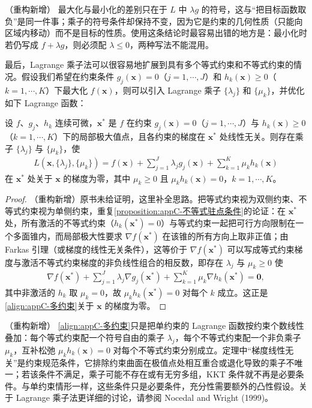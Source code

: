 \documentclass[../main.tex]{subfiles}
\begin{document}
\begin{remark}（重构新增）
最大化与最小化的差别只在于 $L$ 中 $\lambda g$ 的符号，这与“把目标函数取负”是同一件事；乘子的符号条件却保持不变，因为它是约束的几何性质（只能向区域内移动）而不是目标的性质。使用这条结论时最容易出错的地方是：最小化时若仍写成 $f+\lambda g$，则必须配 $\lambda\leqslant0$，两种写法不能混用。
\end{remark}

最后，Lagrange 乘子法可以很容易地扩展到具有多个等式约束和不等式约束的情况。假设我们希望在约束条件 $g_j(\bm{x})=0$（$j=1,\cdots,J$）和 $h_k(\bm{x})\geqslant0$（$k=1,\cdots,K$）下最大化 $f(\bm{x})$，则可以引入 Lagrange 乘子 $\{\lambda_j\}$ 和 $\{\mu_k\}$，并优化如下 Lagrange 函数：
\begin{theorem}\label{theorem:appC-多约束KKT}
设 $f$、$g_j$、$h_k$ 连续可微，$\bm{x}^{*}$ 是 $f$ 在约束 $g_j(\bm{x})=0$（$j=1,\cdots,J$）与 $h_k(\bm{x})\geqslant0$（$k=1,\cdots,K$）下的局部极大值点，且各约束的梯度在 $\bm{x}^{*}$ 处线性无关。则存在乘子 $\{\lambda_j\}$ 与 $\{\mu_k\}$，使
\begin{align}
  L(\bm{x},\{\lambda_j\},\{\mu_k\})=f(\bm{x})+\sum_{j=1}^{J}\lambda_j g_j(\bm{x})+\sum_{k=1}^{K}\mu_k h_k(\bm{x})
  \label{align:appC-多约束}
\end{align}
在 $\bm{x}^{*}$ 处关于 $\bm{x}$ 的梯度为零，其中 $\mu_k\geqslant0$ 且 $\mu_k h_k(\bm{x})=0$，$k=1,\cdots,K$。
\end{theorem}

\begin{proof}
（重构新增）原书未给证明，这里补全思路。把等式约束视为双侧约束、不等式约束视为单侧约束，重复\cref{proposition:appC-不等式驻点条件}的论证：在 $\bm{x}^{*}$ 处，所有激活的不等式约束（$h_k(\bm{x}^{*})=0$）与等式约束一起把可行方向限制在一个多面锥内，而局部极大性要求 $\nabla f(\bm{x}^{*})$ 在该锥的所有方向上取非正值；由 Farkas 引理（或梯度的线性无关条件），这等价于 $\nabla f(\bm{x}^{*})$ 可以写成等式约束梯度与激活不等式约束梯度的非负线性组合的相反数，即存在 $\lambda_j$ 与 $\mu_k\geqslant0$ 使
\begin{align*}
  \nabla f(\bm{x}^{*})+\sum_{j=1}^{J}\lambda_j\nabla g_j(\bm{x}^{*})+\sum_{k=1}^{K}\mu_k\nabla h_k(\bm{x}^{*})=\bm{0},
\end{align*}
其中非激活的 $h_k$ 取 $\mu_k=0$，故 $\mu_k h_k(\bm{x}^{*})=0$ 对每个 $k$ 成立。这正是\eqref{align:appC-多约束}关于 $\bm{x}$ 的梯度为零。
\end{proof}

\begin{remark}（重构新增）
\eqref{align:appC-多约束}只是把单约束的 Lagrange 函数按约束个数线性叠加：每个等式约束配一个符号自由的乘子 $\lambda_j$，每个不等式约束配一个非负乘子 $\mu_k$，互补松弛 $\mu_k h_k(\bm{x})=0$ 对每个不等式约束分别成立。定理中“梯度线性无关”是约束规范条件，它排除约束曲面在极值点处相互重合或退化导致的乘子不唯一；若该条件不满足，乘子可能不存在或有无穷多组，KKT 条件就不再是必要条件。与单约束情形一样，这些条件只是必要条件，充分性需要额外的凸性假设。关于 Lagrange 乘子法更详细的讨论，请参阅 Nocedal and Wright (1999)。
\end{remark}
\end{document}
